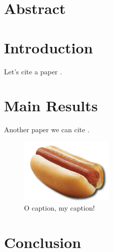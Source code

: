 \section*{Abstract}
  \lipsum[1]

\section{Introduction}
  \lipsum[1]
  Let's cite a paper \cite{BankCVS2011}.

\section{Main Results}
  \lipsum[4]
  Another paper we can cite \cite{Babuska1996}.

  \lipsum[1]

  \begin{figure}
    \centering
    \includegraphics[width=0.4\textwidth]{src/paper1/figs/hotdog.png}
    \caption{O caption, my caption!}
  \end{figure}

  \lipsum[2]

\section{Conclusion}
  \lipsum[2]

